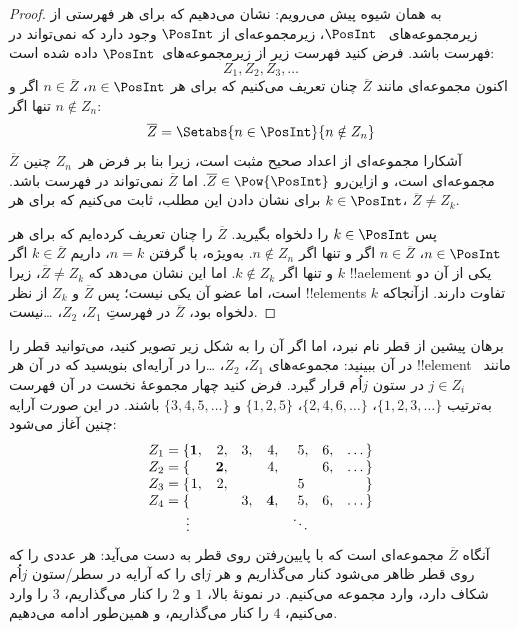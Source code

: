 \documentclass[../../../include/open-logic-section]{subfiles}
\begin{document}
\begin{proof}
به همان شیوه پیش می‌رویم: نشان می‌دهیم که برای هر فهرستی از زیرمجموعه‌های
~$\PosInt$، زیرمجموعه‌ای از $\PosInt$ وجود دارد که نمی‌تواند در فهرست
باشد. فرض کنید فهرست زیر از زیرمجموعه‌های~$\PosInt$ داده شده است:
\[
Z_{1}, Z_{2}, Z_{3}, \dots
\]
اکنون مجموعه‌ای مانند $\overline{Z}$ چنان تعریف می‌کنیم که برای هر
$n \in \PosInt$، $n \in \overline{Z}$ اگر و تنها اگر $n \notin Z_{n}$:
\[
\overline{Z} = \Setabs{n \in \PosInt}{n \notin Z_n}
\]
$\overline{Z}$ آشکارا مجموعه‌ای از اعداد صحیح مثبت است، زیرا بنا بر
فرض هر~$Z_n$ چنین مجموعه‌ای است، و ازاین‌رو $\overline{Z} \in
\Pow{\PosInt}$. اما $\overline{Z}$ نمی‌تواند در فهرست باشد. برای نشان
دادن این مطلب، ثابت می‌کنیم که برای هر $k \in \PosInt$، $\overline{Z} \neq
Z_k$.

پس $k \in \PosInt$ را دلخواه بگیرید. $\overline{Z}$ را چنان تعریف
کرده‌ایم که برای هر $n \in \PosInt$، $n \in \overline{Z}$ اگر و تنها
اگر $n \notin Z_n$. به‌ویژه، با گرفتن $n=k$، داریم $k \in \overline{Z}$
اگر و تنها اگر $k \notin Z_k$. اما این نشان می‌دهد که
$\overline{Z} \neq Z_k$، زیرا $k$ !!a{element} یکی از آن دو است، اما عضو
آن یکی نیست؛ پس $\overline{Z}$ و $Z_k$ از نظر !!{element}s تفاوت دارند.
ازآنجاکه $k$ دلخواه بود، $\overline{Z}$ در فهرستِ $Z_1$، $Z_2$،
\dots نیست.
\end{proof}

\begin{explain}
برهان پیشین از قطر نام نبرد، اما اگر آن را به شکل زیر تصویر کنید،
می‌توانید قطر را در آن ببینید: مجموعه‌های $Z_1$، $Z_2$، \dots را در
آرایه‌ای بنویسید که در آن هر !!{element} مانند~$j \in Z_i$ در ستون
$j$اُم قرار گیرد. فرض کنید چهار مجموعهٔ نخست در آن فهرست به‌ترتیب
$\{1,2,3,\dots\}$، $\{2, 4, 6, \dots\}$، $\{1,2,5\}$ و
$\{3,4,5,\dots\}$ باشند. در این صورت آرایه چنین آغاز می‌شود:
\[
\begin{array}{r@{}rrrrrrr}
  Z_1 = \{ & \mathbf{1}, & 2, & 3, & 4, & 5, & 6, & \dots\}\\
  Z_2 = \{ &  & \mathbf{2}, &  & 4, &  & 6, & \dots\}\\
  Z_3 = \{ & 1, & 2, &  &  & 5\phantom{,} &  & \}\\
  Z_4 = \{ &  &  & 3, & \mathbf{4}, & 5, & 6, & \dots\}\\
  \vdots & & & & & \ddots
\end{array}
\]
آنگاه $\overline{Z}$ مجموعه‌ای است که با پایین‌رفتن روی قطر به دست
می‌آید: هر عددی را که روی قطر ظاهر می‌شود کنار می‌گذاریم و هر $j$ای را
که آرایه در سطر/ستون $j$اُم شکاف دارد، وارد مجموعه می‌کنیم. در نمونهٔ
بالا، $1$ و $2$ را کنار می‌گذاریم، $3$ را وارد می‌کنیم، $4$ را کنار
می‌گذاریم، و همین‌طور ادامه می‌دهیم.
\end{explain}
\end{document}
